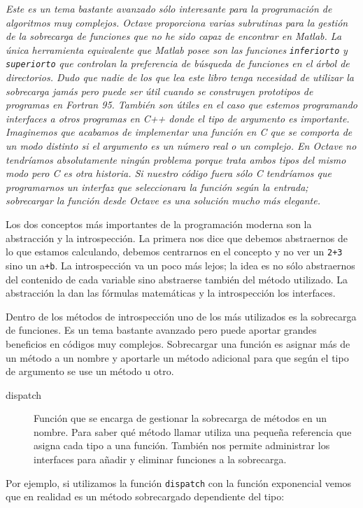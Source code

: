 \emph{Este es un tema bastante avanzado sólo interesante para la
  programación de algoritmos muy complejos. Octave proporciona varias
  subrutinas para la gestión de la sobrecarga de funciones que no he
  sido capaz de encontrar en Matlab. La única herramienta equivalente
  que Matlab posee son las funciones} \texttt{\emph{inferiorto}}
\emph{y} \texttt{\emph{superiorto}} \emph{que controlan la preferencia
  de búsqueda de funciones en el árbol de directorios. Dudo que nadie
  de los que lea este libro tenga necesidad de utilizar la sobrecarga
  jamás pero puede ser útil cuando se construyen prototipos de
  programas en Fortran 95. También son útiles en el caso que estemos
  programando interfaces a otros programas en C++ donde el tipo de
  argumento es importante. Imaginemos que acabamos de implementar una
  función en C que se comporta de un modo distinto si el argumento es
  un número real o un complejo. En Octave no tendríamos absolutamente
  ningún problema porque trata ambos tipos del mismo modo pero C es
  otra historia. Si nuestro código fuera sólo C tendríamos que
  programarnos un interfaz que seleccionara la función según la
  entrada; sobrecargar la función desde Octave es una solución mucho
  más elegante.}

Los dos conceptos más importantes de la programación moderna son la
abstracción y la introspección. La primera nos dice que debemos
abstraernos de lo que estamos calculando, debemos centrarnos en el
concepto y no ver un \texttt{2+3} sino un a\texttt{+b}. La
introspección va un poco más lejos; la idea es no sólo abstraernos del
contenido de cada variable sino abstraerse también del método
utilizado. La abstracción la dan las fórmulas matemáticas y la
introspección los interfaces.

Dentro de los métodos de introspección uno de los más utilizados es la
sobrecarga de funciones. Es un tema bastante avanzado pero puede
aportar grandes beneficios en códigos muy complejos. Sobrecargar una
función es asignar más de un método a un nombre y aportarle un método
adicional para que según el tipo de argumento se use un método u otro.

\begin{description}
\item [dispatch]Función que se encarga de gestionar la
  sobrecarga de métodos en un nombre. Para saber qué método llamar
  utiliza una pequeña referencia que asigna cada tipo a una función.
  También nos permite administrar los interfaces para añadir y
  eliminar funciones a la sobrecarga.
\end{description}
Por ejemplo, si utilizamos la función \texttt{dispatch} con la función
exponencial vemos que en realidad es un método sobrecargado
dependiente del tipo:

